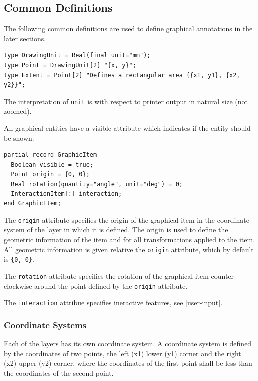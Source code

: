 \subsection{Common Definitions}\label{common-definitions}

The following common definitions are used to define graphical annotations in the later sections.
\begin{lstlisting}[language=modelica]
type DrawingUnit = Real(final unit="mm");
type Point = DrawingUnit[2] "{x, y}";
type Extent = Point[2] "Defines a rectangular area {{x1, y1}, {x2, y2}}";
\end{lstlisting}%
The interpretation of \lstinline!unit! is with respect to printer output in natural size (not zoomed).

All graphical entities have a visible attribute which indicates if the entity should be shown.
\begin{lstlisting}[language=modelica]
partial record GraphicItem
  Boolean visible = true;
  Point origin = {0, 0};
  Real rotation(quantity="angle", unit="deg") = 0;
  InteractionItem[:] interaction;
end GraphicItem;
\end{lstlisting}%
The \lstinline!origin! attribute specifies the origin of the graphical item in the coordinate system of the layer in which it is defined.
The origin is used to define the geometric information of the item and for all transformations applied to the item.
All geometric information is given relative the \lstinline!origin! attribute, which by default is \lstinline!{0, 0}!.

The \lstinline!rotation! attribute specifies the rotation of the graphical item counter-clockwise around the point defined by the \lstinline!origin! attribute.

The \lstinline!interaction! attribue specifies ineractive features, see \cref{user-input}.

\subsubsection{Coordinate Systems}\label{coordinate-systems}

Each of the layers has its own coordinate system.
A coordinate system is defined by the coordinates of two points, the left (x1) lower (y1) corner and the right (x2) upper (y2) corner, where the coordinates of the first point shall be less than the coordinates of the second point.

